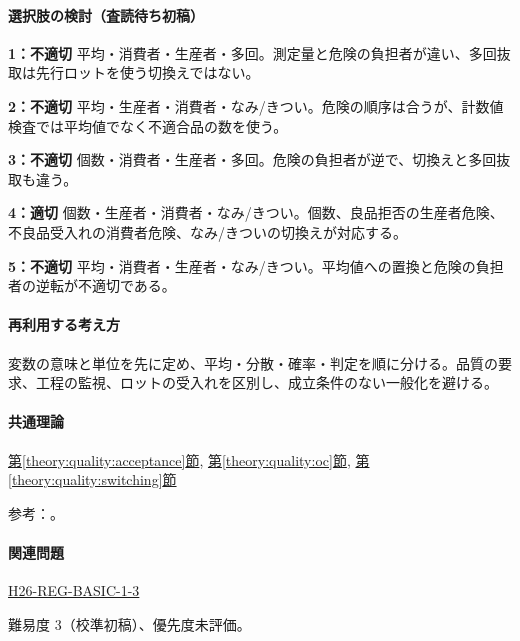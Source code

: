 \paragraph{選択肢の検討（査読待ち初稿）}\mbox{}\par

\noindent\textbf{1：不適切} 平均・消費者・生産者・多回。測定量と危険の負担者が違い、多回抜取は先行ロットを使う切換えではない。\par

\noindent\textbf{2：不適切} 平均・生産者・消費者・なみ/きつい。危険の順序は合うが、計数値検査では平均値でなく不適合品の数を使う。\par

\noindent\textbf{3：不適切} 個数・消費者・生産者・多回。危険の負担者が逆で、切換えと多回抜取も違う。\par

\noindent\textbf{4：適切} 個数・生産者・消費者・なみ/きつい。個数、良品拒否の生産者危険、不良品受入れの消費者危険、なみ/きついの切換えが対応する。\par

\noindent\textbf{5：不適切} 平均・消費者・生産者・なみ/きつい。平均値への置換と危険の負担者の逆転が不適切である。\par

\paragraph{再利用する考え方} 変数の意味と単位を先に定め、平均・分散・確率・判定を順に分ける。品質の要求、工程の監視、ロットの受入れを区別し、成立条件のない一般化を避ける。

\paragraph{共通理論} \hyperref[theory:quality:acceptance]{第\ref*{theory:quality:acceptance}節}, \hyperref[theory:quality:oc]{第\ref*{theory:quality:oc}節}, \hyperref[theory:quality:switching]{第\ref*{theory:quality:switching}節}

\par 参考：\cite{quality_nist_sampling,quality_nist_oc}。

\paragraph{関連問題} \hyperref[q:h26-reg-basic-1-3]{H26-REG-BASIC-1-3}

\par 難易度 3（校準初稿）、優先度未評価。


